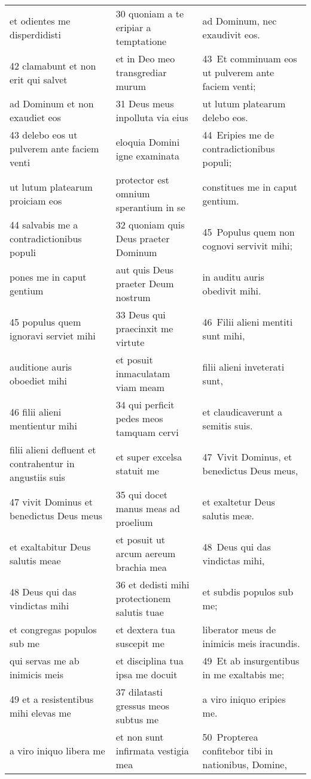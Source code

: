 \documentclass{article}
\begin{document}
\begin{longtable}{@{}p{}p{}p{}@{}}
et odientes me disperdidisti	&	30 quoniam a te eripiar a temptatione	&	ad Dominum, nec exaudivit eos.	\\
42 clamabunt et non erit qui salvet	&	et in Deo meo transgrediar murum	&	43 Et comminuam eos ut pulverem ante faciem venti;	\\
ad Dominum et non exaudiet eos	&	31 Deus meus inpolluta via eius	&	ut lutum platearum delebo eos.	\\
43 delebo eos ut pulverem ante faciem venti	&	eloquia Domini igne examinata	&	44 Eripies me de contradictionibus populi;	\\
ut lutum platearum proiciam eos	&	protector est omnium sperantium in se	&	constitues me in caput gentium.	\\
44 salvabis me a contradictionibus populi	&	32 quoniam quis Deus praeter Dominum	&	45 Populus quem non cognovi servivit mihi;	\\
pones me in caput gentium	&	aut quis Deus praeter Deum nostrum	&	in auditu auris obedivit mihi.	\\
45 populus quem ignoravi serviet mihi	&	33 Deus qui praecinxit me virtute	&	46 Filii alieni mentiti sunt mihi,	\\
auditione auris oboediet mihi	&	et posuit inmaculatam viam meam	&	filii alieni inveterati sunt,	\\
46 filii alieni mentientur mihi	&	34 qui perficit pedes meos tamquam cervi	&	et claudicaverunt a semitis suis.	\\
filii alieni defluent et contrahentur in angustiis suis	&	et super excelsa statuit me	&	47 Vivit Dominus, et benedictus Deus meus,	\\
47 vivit Dominus et benedictus Deus meus	&	35 qui docet manus meas ad proelium	&	et exaltetur Deus salutis meæ.	\\
et exaltabitur Deus salutis meae	&	et posuit ut arcum aereum brachia mea	&	48 Deus qui das vindictas mihi,	\\
48 Deus qui das vindictas mihi	&	36 et dedisti mihi protectionem salutis tuae	&	et subdis populos sub me;	\\
et congregas populos sub me	&	et dextera tua suscepit me	&	liberator meus de inimicis meis iracundis.	\\
qui servas me ab inimicis meis	&	et disciplina tua ipsa me docuit	&	49 Et ab insurgentibus in me exaltabis me;	\\
49 et a resistentibus mihi elevas me	&	37 dilatasti gressus meos subtus me	&	a viro iniquo eripies me.	\\
a viro iniquo libera me	&	et non sunt infirmata vestigia mea	&	50 Propterea confitebor tibi in nationibus, Domine,	\\

\end{longtable}
\end{document}
